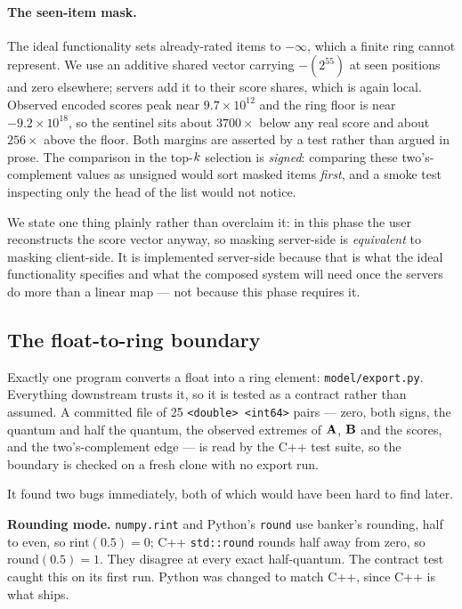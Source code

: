 \paragraph{The seen-item mask.} The ideal functionality sets already-rated
items to $-\infty$, which a finite ring cannot represent. We use an additive
shared vector carrying $-(2^{55})$ at seen positions and zero elsewhere;
servers add it to their score shares, which is again local. Observed encoded
scores peak near $9.7 \times 10^{12}$ and the ring floor is near
$-9.2 \times 10^{18}$, so the sentinel sits about $3700\times$ below any real
score and about $256\times$ above the floor. Both margins are asserted by a
test rather than argued in prose. The comparison in the top-$k$ selection
is \emph{signed}: comparing these two's-complement values as unsigned would
sort masked items \emph{first}, and a smoke test inspecting only the head of
the list would not notice.

We state one thing plainly rather than overclaim it: in this phase the user
reconstructs the score vector anyway, so masking server-side is
\emph{equivalent} to masking client-side. It is implemented server-side because
that is what the ideal functionality specifies and what the composed system
will need once the servers do more than a linear map --- not because this phase
requires it.

\subsection{The float-to-ring boundary}
\label{sec:tech:pir:boundary}

Exactly one program converts a float into a ring element:
\texttt{model/export.py}. Everything downstream trusts it, so it is tested as a
contract rather than assumed. A committed file of 25 \texttt{<double> <int64>}
pairs --- zero, both signs, the quantum and half the quantum, the observed
extremes of $\mathbf{A}$, $\mathbf{B}$ and the scores, and the two's-complement
edge --- is read by the C++ test suite, so the boundary is checked on a fresh
clone with no export run.

It found two bugs immediately, both of which would have been hard to find
later.

\textbf{Rounding mode.} \texttt{numpy.rint} and Python's \texttt{round} use
banker's rounding, half to even, so $\mathrm{rint}(0.5) = 0$; C++
\texttt{std::round} rounds half away from zero, so $\mathrm{round}(0.5) = 1$.
They disagree at every exact half-quantum. The contract test caught this on its
first run. Python was changed to match C++, since C++ is what ships.

